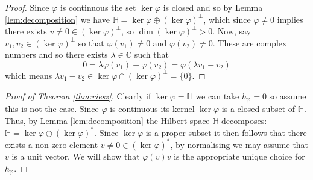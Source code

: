 \documentclass[12pt]{article}
\theoremstyle{plain}
\theoremstyle{definition}
\newcommand{\bb}[1]{\mathbb{#1}}
\begin{document}
\begin{proof}
	Since $\varphi$ is continuous the set $\operatorname{ker}\varphi$ is closed and so by Lemma \ref{lem:decomposition} we have $\bb{H} = \operatorname{ker}\varphi \oplus (\operatorname{ker}\varphi)^\perp$, which since $\varphi\neq 0$ implies there exists $v\neq 0 \in (\operatorname{ker}\varphi)^\perp$, so $\operatorname{dim}(\operatorname{ker}\varphi)^\perp > 0$. Now, say $v_1,v_2 \in (\operatorname{ker}\varphi)^\perp$ so that $\varphi(v_1) \neq 0$ and $\varphi(v_2) \neq 0$. These are complex numbers and so there exists $\lambda \in \bb{C}$ such that
	\[0 = \lambda \varphi(v_1) - \varphi(v_2) = \varphi(\lambda v_1 - v_2)\]
	which means $\lambda v_1 - v_2 \in \operatorname{ker}\varphi \cap (\operatorname{ker}\varphi)^\perp = \lbrace 0 \rbrace$.
\end{proof}
\begin{proof}[Proof of Theorem \ref{thm:riesz}]
	Clearly if $\operatorname{ker}\varphi = \bb{H}$ we can take $h_\varphi = 0$ so assume this is not the case. Since $\varphi$ is continuous its kernel $\operatorname{ker}\varphi$ is a closed subset of $\bb{H}$. Thus, by Lemma \ref{lem:decomposition} the Hilbert space $\bb{H}$ decomposes: $\bb{H} = \operatorname{ker}\varphi \oplus (\operatorname{ker}\varphi)^\ast$. Since $\operatorname{ker}\varphi$ is a proper subset it then follows that there exists a non-zero element $v\neq0 \in (\operatorname{ker}\varphi)^\ast$, by normalising we may assume that $v$ is a unit vector. We will show that $\overline{\varphi(v)}v$ is the appropriate unique choice for $h_\varphi$.
	

\end{proof}
\end{document}
